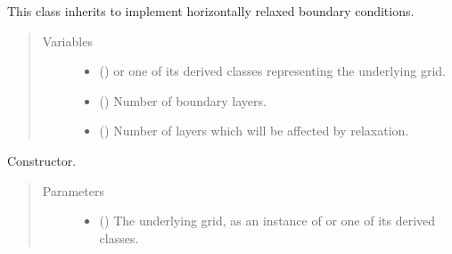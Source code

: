 \documentclass[letterpaper,10pt,english]{sphinxmanual}
\begin{document}

\begin{fulllineitems}
\label{\detokenize{api:tasmania.dycore.horizontal_boundary_relaxed.Relaxed}}
This class inherits {\hyperref[\detokenize{api:tasmania.dycore.horizontal_boundary.HorizontalBoundary}]{}} to implement horizontally
relaxed boundary conditions.
\begin{quote}\begin{description}
\item[{Variables}] \leavevmode\begin{itemize}
\item {} 
 () \textendash{} {\hyperref[\detokenize{api:tasmania.grids.grid_xyz.GridXYZ}]{}} or one of its derived classes representing the underlying grid.

\item {} 
{\hyperref[\detokenize{api:tasmania.dycore.prognostic_isentropic.PrognosticIsentropic.nb}]{}} () \textendash{} Number of boundary layers.

\item {} 
 () \textendash{} Number of layers which will be affected by relaxation.

\end{itemize}

\end{description}\end{quote}

\begin{fulllineitems}
\label{\detokenize{api:tasmania.dycore.horizontal_boundary_relaxed.Relaxed.__init__}}
Constructor.
\begin{quote}\begin{description}
\item[{Parameters}] \leavevmode\begin{itemize}
\item {} 
 () \textendash{} The underlying grid, as an instance of {\hyperref[\detokenize{api:tasmania.grids.grid_xyz.GridXYZ}]{}} or one of its derived classes.


\end{itemize}
\end{description}
\end{quote}
\end{fulllineitems}
\end{fulllineitems}
\end{document}
